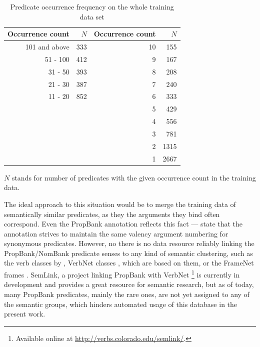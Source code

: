 \documentclass[12pt,notitlepage]{report}
\begin{document}
\begin{table}[htb]\footnotesize
\caption{Predicate occurrence frequency on the whole training data set}\label{tab:pred-freq}
\begin{center}
\shorthandoff{-}
\begin{tabular}{|r|r||r|r|}\hline
\bf Occurrence count & \bf $N$ & \bf Occurrence count & \bf $N$ \\\hline
101 and above & 333 & 10 & 155 \\\cline{1-2}
51 - 100 & 412 & 9 & 167 \\
31 - 50 & 393 & 8 & 208 \\\cline{1-2}
21 - 30 & 387 & 7 & 240 \\
11 - 20 & 852 & 6 & 333 \\\cline{1-2}
\multicolumn{2}{c|}{}& 5 & 429 \\
\multicolumn{2}{c|}{}& 4 & 556 \\
\multicolumn{2}{c|}{}& 3 & 781 \\
\multicolumn{2}{c|}{}& 2 & 1315 \\
\multicolumn{2}{c|}{}& 1 & 2667 \\\cline{3-4}
\end{tabular}
\shorthandoff{-}
\end{center}
$N$ stands for number of predicates with the given occurrence count in the training data.
\end{table}

The ideal approach to this situation would be to merge the training data of semantically similar predicates, as they the arguments they bind often correspond. Even the PropBank annotation reflects this fact --- \citet{kingsbury02} state that the annotation strives to maintain the same valency argument numbering for synonymous predicates. However, no there is no data resource reliably linking the PropBank/NomBank predicate senses to any kind of semantic clustering, such as the verb classes by \citet{levin93}, VerbNet classes \citep{kipper-schuler05}, which are based on them, or the FrameNet frames \citep{baker98,baker02}. SemLink, a project linking PropBank with VerbNet \citep{loper07}\footnote{Available online at \url{http://verbs.colorado.edu/semlink/}.} is currently in development and provides a great resource for semantic research, but as of today, many PropBank predicates, mainly the rare ones, are not yet assigned to any of the semantic groups, which hinders automated usage of this database in the present work.
\end{document}
